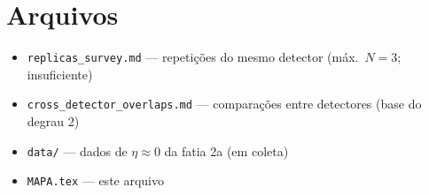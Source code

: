 \documentclass[11pt,a4paper]{article}
\newcommand{\arq}[1]{\texttt{\nolinkurl{#1}}}
\begin{document}
\section*{Arquivos}
\begin{itemize}[nosep]
\item \arq{replicas_survey.md} --- repetições do mesmo detector (máx.\ $N=3$; insuficiente)
\item \arq{cross_detector_overlaps.md} --- comparações entre detectores (base do degrau 2)
\item \arq{data/} --- dados de $\eta\approx0$ da fatia 2a (em coleta)
\item \arq{MAPA.tex} --- este arquivo
\end{itemize}
\end{document}
